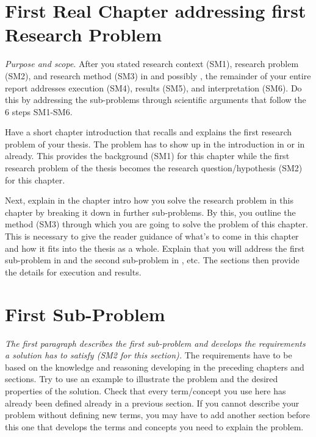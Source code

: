 \section{First Real Chapter addressing first Research Problem}\label{sec:problem1}

\emph{Purpose and scope}.
After you stated research context (SM1), research problem (SM2), and research method (SM3) in  and possibly , the remainder of your entire report addresses execution (SM4), results (SM5), and interpretation (SM6).
Do this by addressing the sub-problems through scientific arguments that follow the 6 steps SM1-SM6.

Have a short chapter introduction that recalls and explains the first research problem of your thesis.
The problem has to show up in the introduction in  or in  already.
This provides the background (SM1) for this chapter while the first research problem of the thesis becomes the research question/hypothesis (SM2) for this chapter.

Next, explain in the chapter intro how you solve the research problem in this chapter by breaking it down in further sub-problems.
By this, you outline the method (SM3) through which you are going to solve the problem of this chapter.
This is necessary to give the reader guidance of what's to come in this chapter and how it fits into the thesis as a whole.
Explain that you will address the first sub-problem in  and the second sub-problem in , etc. The sections then provide the details for execution and results.

\section{First Sub-Problem}\label{sec:problem1:subproblem1}

\emph{The first paragraph describes the first sub-problem and develops the requirements a solution has to satisfy (SM2 for this section).}
The requirements have to be based on the knowledge and reasoning developing in the preceding chapters and sections.
Try to use an example to illustrate the problem and the desired properties of the solution.
Check that every term/concept you use here has already been defined already in a previous section.
If you cannot describe your problem without defining new terms, you may have to add another section before this one that develops the terms and concepts you need to explain the problem.


